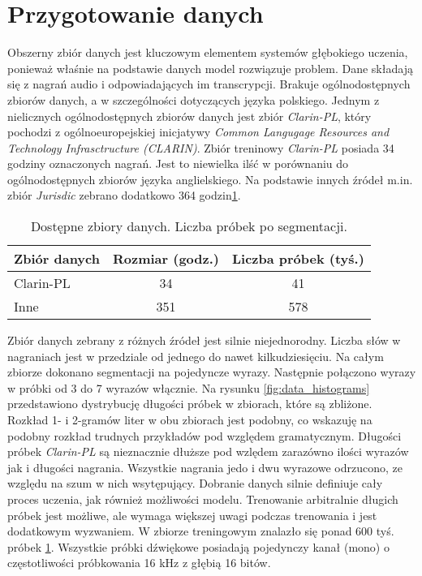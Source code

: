 
\section{Przygotowanie danych}

Obszerny zbiór danych jest kluczowym elementem systemów głębokiego uczenia,
ponieważ właśnie na podstawie danych model rozwiązuje problem.
Dane składają się z nagrań audio i odpowiadających im transcrypcji.
Brakuje ogólnodostępnych zbiorów danych, a w szczególności dotyczących języka polskiego.
Jednym z nielicznych ogólnodostępnych zbiorów danych jest zbiór \emph{Clarin-PL}\cite{pjatk_corpus}, który pochodzi
z ogólnoeuropejskiej inicjatywy \emph{Common Langugage Resources and Technology Infrasctructure (CLARIN)}.
Zbiór treninowy \emph{Clarin-PL} posiada 34 godziny oznaczonych nagrań.
Jest to niewielka ilść w porównaniu do ogólnodostępnych zbiorów języka anglielskiego.
Na podstawie innych źródeł m.in. zbiór \emph{Jurisdic}\cite{dataset_jurisdic} zebrano dodatkowo 364 godzin\ref{table:datasets}.

\begin{table}[h!]
\centering
 \begin{tabular}{l c c}
  \toprule
  Zbiór danych & Rozmiar (godz.) & Liczba próbek (tyś.) \\
  \midrule
  Clarin-PL & 34  & 41 \\
  Inne & 351 & 578 \\
  \bottomrule
 \end{tabular}
\caption{
Dostępne zbiory danych.
Liczba próbek po segmentacji.}
\label{table:datasets}
\end{table}

Zbiór danych zebrany z różnych źródeł jest silnie niejednorodny.
Liczba słów w nagraniach jest w przedziale od jednego do nawet kilkudziesięciu.
Na całym zbiorze dokonano segmentacji na pojedyncze wyrazy.
Następnie połączono wyrazy w próbki od 3 do 7 wyrazów włącznie.
Na rysunku \ref{fig:data_histograms} przedstawiono dystrybucję długości próbek w zbiorach,
które są zbliżone.
Rozkład 1- i 2-gramów liter w obu zbiorach jest podobny, co wskazuję na podobny rozkład
trudnych przykładów pod względem gramatycznym.
Długości próbek \emph{Clarin-PL} są nieznacznie dłuższe pod wzlędem zarazówno ilości wyrazów jak i długości nagrania.
Wszystkie nagrania jedo i dwu wyrazowe odrzucono, ze względu na szum w nich wsytępujący.
Dobranie danych silnie definiuje cały proces uczenia, jak również możliwości modelu.
Trenowanie arbitralnie długich próbek jest możliwe, ale wymaga większej uwagi podczas trenowania
i jest dodatkowym wyzwaniem.
W zbiorze treningowym znalazło się ponad 600 tyś. próbek \ref{table:datasets}.
Wszystkie próbki dźwiękowe posiadają pojedynczy kanał (mono) o częstotliwości próbkowania 16 kHz z głębią 16 bitów.

